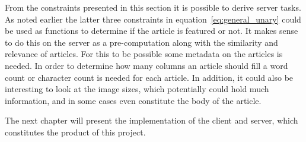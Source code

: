 From the constraints presented in this section it is possible to derive server tasks. As noted earlier the latter three constraints in equation~\ref{eq:general_unary} could be used as functions to determine if the article is featured or not. It makes sense to do this on the server as a pre-computation along with the similarity and relevance of articles. For this to be possible some metadata on the articles is needed. In order to determine how many columns an article should fill a word count or character count is needed for each article. In addition, it could also be interesting to look at the image sizes, which potentially could hold much information, and in some cases even constitute the body of the article.

The next chapter will present the implementation of the client and server, which constitutes the product of this project.
%
%

